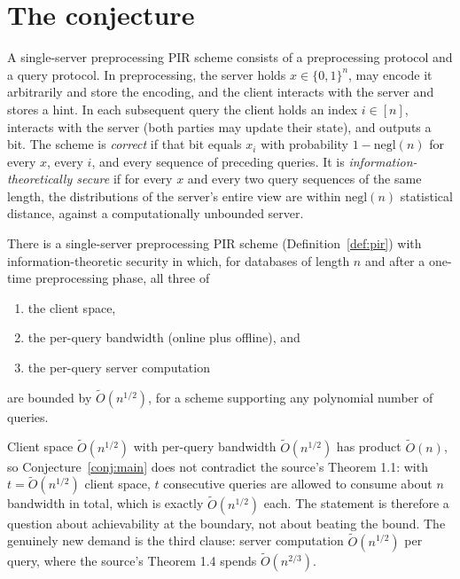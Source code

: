 \documentclass{conjura-conjecture}
\newcommand{\Ot}{\widetilde{O}}
\begin{document}
\section{The conjecture}\label{sec:conjectures}

\begin{definition}\label{def:pir}
A single-server preprocessing PIR scheme consists of a preprocessing
protocol and a query protocol. In preprocessing, the server holds $x \in
\{0,1\}^{n}$, may encode it arbitrarily and store the encoding, and the
client interacts with the server and stores a hint. In each subsequent
query the client holds an index $i \in [n]$, interacts with the server
(both parties may update their state), and outputs a bit. The scheme is
\emph{correct} if that bit equals $x_{i}$ with probability $1 -
\mathrm{negl}(n)$ for every $x$, every $i$, and every sequence of
preceding queries. It is \emph{information-theoretically secure} if for
every $x$ and every two query sequences of the same length, the
distributions of the server's entire view are within
$\mathrm{negl}(n)$ statistical distance, against a computationally
unbounded server.
\end{definition}

\begin{conjecture}\label{conj:main}
There is a single-server preprocessing PIR scheme
(Definition~\ref{def:pir}) with information-theoretic security in which,
for databases of length $n$ and after a one-time preprocessing phase,
all three of
\begin{enumerate}[nosep,label=(\alph*)]
  \item the client space,
  \item the per-query bandwidth (online plus offline), and
  \item the per-query server computation
\end{enumerate}
are bounded by $\Ot(n^{1/2})$, for a scheme supporting any polynomial
number of queries.
\end{conjecture}

\begin{remark}\label{rem:tight}
Client space $\Ot(n^{1/2})$ with per-query bandwidth $\Ot(n^{1/2})$ has
product $\Ot(n)$, so Conjecture~\ref{conj:main} does not contradict the
source's Theorem 1.1: with $t = \Ot(n^{1/2})$ client space, $t$
consecutive queries are allowed to consume about $n$ bandwidth in total,
which is exactly $\Ot(n^{1/2})$ each. The statement is therefore a
question about achievability at the boundary, not about beating the
bound. The genuinely new demand is the third clause: server computation
$\Ot(n^{1/2})$ per query, where the source's Theorem 1.4 spends
$\Ot(n^{2/3})$.
\end{remark}
\end{document}
